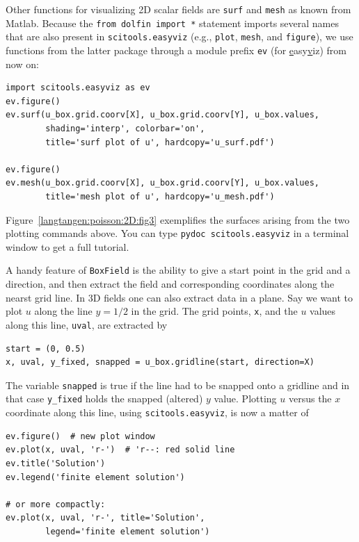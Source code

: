 Other functions for visualizing 2D scalar fields are {\fontsize{12pt}{12pt}\texttt{surf}} and
{\fontsize{12pt}{12pt}\texttt{mesh}} as known from Matlab. Because the {\fontsize{12pt}{12pt}\texttt{from dolfin import *}}
statement imports several names that are also present
in {\fontsize{12pt}{12pt}\texttt{scitools.easyviz}} (e.g., {\fontsize{12pt}{12pt}\texttt{plot}}, {\fontsize{12pt}{12pt}\texttt{mesh}}, and
{\fontsize{12pt}{12pt}\texttt{figure}}), we use functions from the latter package through a
module prefix {\fontsize{12pt}{12pt}\texttt{ev}} (for \underline{e}asy\underline{v}iz) from now on:
\begin{Verbatim}[fontsize=\fontsize{10pt}{10pt},tabsize=8,baselinestretch=1.05,
fontfamily=tt,xleftmargin=7mm]
import scitools.easyviz as ev
ev.figure()
ev.surf(u_box.grid.coorv[X], u_box.grid.coorv[Y], u_box.values,
        shading='interp', colorbar='on',
        title='surf plot of u', hardcopy='u_surf.pdf')

ev.figure()
ev.mesh(u_box.grid.coorv[X], u_box.grid.coorv[Y], u_box.values,
        title='mesh plot of u', hardcopy='u_mesh.pdf')
\end{Verbatim}
\noindent
Figure~\ref{langtangen:poisson:2D:fig3} exemplifies the surfaces arising from
the two plotting commands above.
You can type
{\fontsize{12pt}{12pt}\texttt{pydoc scitools.easyviz}} in a terminal window
to get a full tutorial.

A handy feature of {\fontsize{12pt}{12pt}\texttt{BoxField}} is the ability to give a start point
in the grid and a direction, and then extract the field and corresponding
coordinates along the nearst grid
line. In 3D fields
one can also extract data in a plane.
Say we
want to plot $u$ along the line $y=1/2$ in the grid. The grid points,
{\fontsize{12pt}{12pt}\texttt{x}}, and the
$u$ values along this line, {\fontsize{12pt}{12pt}\texttt{uval}}, are extracted by
\begin{Verbatim}[fontsize=\fontsize{10pt}{10pt},tabsize=8,baselinestretch=1.05,
fontfamily=tt,xleftmargin=7mm]
start = (0, 0.5)
x, uval, y_fixed, snapped = u_box.gridline(start, direction=X)
\end{Verbatim}
\noindent
The variable {\fontsize{12pt}{12pt}\texttt{snapped}} is true if the line had to be snapped onto a
gridline and in that case {\fontsize{12pt}{12pt}\verb!y_fixed!} holds the snapped
(altered) $y$ value.
Plotting $u$ versus the $x$ coordinate along this line, using
{\fontsize{12pt}{12pt}\texttt{scitools.easyviz}}, is now a matter of
\begin{Verbatim}[fontsize=\fontsize{10pt}{10pt},tabsize=8,baselinestretch=1.05,
fontfamily=tt,xleftmargin=7mm]
ev.figure()  # new plot window
ev.plot(x, uval, 'r-')  # 'r--: red solid line
ev.title('Solution')
ev.legend('finite element solution')

# or more compactly:
ev.plot(x, uval, 'r-', title='Solution',
        legend='finite element solution')
\end{Verbatim}
\noindent

